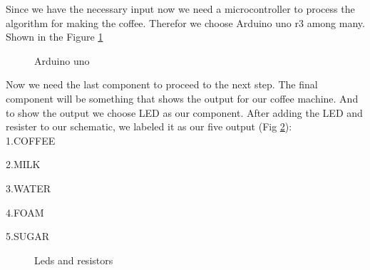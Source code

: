 \documentclass[12pt]{article}
\begin{document}
Since we have the necessary input now we need a microcontroller to process the algorithm for making the coffee. Therefor we choose Arduino uno r3 among many. Shown in the Figure \ref{fig:eagle3}

\begin{figure}[H]
\caption{Arduino uno}
\label{fig:eagle3}
\end{figure}


Now we need the last component to proceed to the next step. The final component will be something that shows the output for our coffee machine. And to show the output we choose LED as our component. After adding the LED and resister to our schematic, we labeled it as our five output (Fig \ref{fig:eagle4}):  \\

	1.COFFEE

	2.MILK

	3.WATER

	4.FOAM

	5.SUGAR\\
	

\begin{figure}[H]
\caption{Leds and resistors}
\label{fig:eagle4}
\end{figure}
\end{document}
